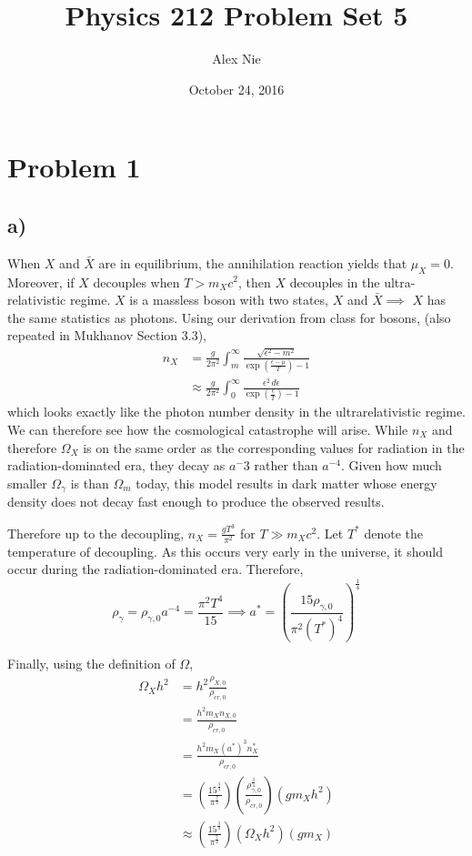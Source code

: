\documentclass{article}
\title{Physics 212 Problem Set 5}
\author{Alex Nie}
\date{October 24, 2016}
\begin{document}
\maketitle

\section*{Problem 1}
\subsection*{a)}
When $X$ and $\bar{X}$ are in equilibrium, the annihilation reaction yields that $\mu_X=0$. Moreover, if $X$ decouples when $T>m_X c^2$, then $X$ decouples in the ultra-relativistic regime. $X$ is a massless boson with two states, $X$ and $\bar{X}\implies$ $X$ has the same statistics as photons. Using our derivation from class for bosons, (also repeated in Mukhanov Section 3.3), 
\begin{align*}
n_X &= \frac{g}{2\pi^2}\int_m^\infty \frac{\sqrt{\epsilon^2-m^2}}{\exp(\frac{\epsilon-\mu}{T})-1}\\
&\approx \frac{g}{2\pi^2}\int_0^\infty \frac{\epsilon^2\,d\epsilon}{\exp(\frac{\epsilon}{T})-1}
\end{align*}
which looks exactly like the photon number density in the ultrarelativistic regime. We can therefore see how the cosmological catastrophe will arise. While $n_X$ and therefore $\Omega_X$ is on the same order as the corresponding values for radiation in the radiation-dominated era, they decay as $a^-3$ rather than $a^{-4}$. Given how much smaller $\Omega_\gamma$ is than $\Omega_m$ today, this model results in dark matter whose energy density does not decay fast enough to produce the observed results.

Therefore up to the decoupling, $n_X = \frac{gT^3}{\pi^2}$ for $T\gg m_X c^2$. Let $T^*$ denote the temperature of decoupling. As this occurs very early in the universe, it should occur during the radiation-dominated era. Therefore,
\[\rho_\gamma = \rho_{\gamma,0}a^{-4} = \frac{\pi^2 T^4}{15}\implies a^* = \left(\frac{15\rho_{\gamma,0}}{\pi^2 (T^*)^4}\right)^{\frac{1}{4}}\]

Finally, using the definition of $\Omega$, 
\begin{align*}
\Omega_X h^2 &= h^2\frac{\rho_{X,0}}{\rho_{cr,0}}\\
&=\frac{h^2m_X n_{X,0}}{\rho_{cr,0}}\\
&= \frac{h^2 m_X (a^*)^3 n^*_X}{\rho_{cr,0}}\\
&= \left(\frac{15^{\frac{3}{4}}}{\pi^{\frac{7}{2}}}\right)\left(\frac{\rho_{\gamma,0}^{\frac{3}{4}}}{\rho_{cr,0}}\right)\left(g m_X h^2\right)\\
&\approx \left(\frac{15^{\frac{3}{4}}}{\pi^{\frac{7}{2}}}\right)(\Omega_X h^2)(gm_X)
\end{align*}
\end{document}
